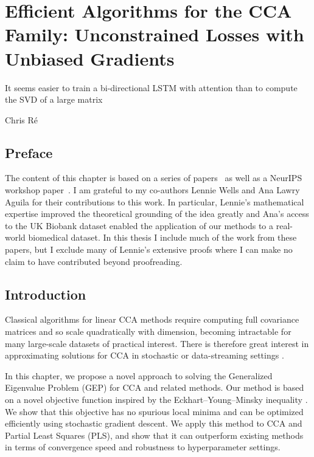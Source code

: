 \graphicspath{{chapters/gradient_descent/}}


\chapter{Efficient Algorithms for the CCA Family: Unconstrained Losses with Unbiased Gradients}\label{ch:gradient_descent}
\epigraph{It seems easier to train a bi-directional LSTM with attention than to compute the SVD of a large matrix}{Chris Ré}\citep{gemp2021}
\minitoc
\section*{Preface}
The content of this chapter is based on a series of papers~\citep{chapman2022generalized, chapman2023efficient} as well as a NeurIPS workshop paper~\citep{chapman2023cca}.
I am grateful to my co-authors Lennie Wells and Ana Lawry Aguila for their contributions to this work.
In particular, Lennie's mathematical expertise improved the theoretical grounding of the idea greatly and Ana's access to the UK Biobank dataset enabled the application of our methods to a real-world biomedical dataset.
In this thesis I include much of the work from these papers, but I exclude many of Lennie's extensive proofs where I can make no claim to have contributed beyond proofreading.

\section{Introduction}

Classical algorithms for linear CCA methods require computing full covariance matrices and so scale quadratically with dimension, becoming intractable for many large-scale datasets of practical interest.
There is therefore great interest in approximating solutions for CCA in stochastic or data-streaming settings \citep{arora2012stochastic}.

In this chapter, we propose a novel approach to solving the Generalized Eigenvalue Problem (GEP) for CCA and related methods.
Our method is based on a novel objective function inspired by the Eckhart--Young--Minsky inequality \citep{stewart_matrix_1990}.
We show that this objective has no spurious local minima and can be optimized efficiently using stochastic gradient descent.
We apply this method to CCA and Partial Least Squares (PLS), and show that it can outperform existing methods in terms of convergence speed and robustness to hyperparameter settings.

